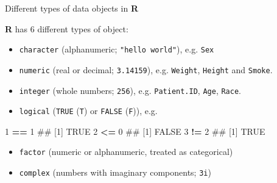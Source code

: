 \documentclass[ignorenonframetext,]{beamer}
\newenvironment{Shaded}{\begin{snugshade}}{\end{snugshade}}
\newcommand{\DecValTok}[1]{\textcolor[rgb]{0.00,0.00,0.81}{#1}}
\newcommand{\StringTok}[1]{\textcolor[rgb]{0.31,0.60,0.02}{#1}}
\newcommand{\OperatorTok}[1]{\textcolor[rgb]{0.81,0.36,0.00}{\textbf{#1}}}
\newcommand{\NormalTok}[1]{#1}
\providecommand{\tightlist}{%
  \setlength{\itemsep}{0pt}\setlength{\parskip}{0pt}}
\let\oldShaded\Shaded
\let\endoldShaded\endShaded
\renewenvironment{Shaded}{\footnotesize\oldShaded}{\endoldShaded}
\begin{document}
\begin{frame}[fragile]{Different types of data objects in \textbf{R}}

\textbf{R} has 6 different types of object:

\begin{itemize}
\tightlist
\item
  \texttt{character} (alphanumeric; \texttt{"hello\ world"}), e.g.
  \texttt{Sex}
\item
  \texttt{numeric} (real or decimal; \texttt{3.14159}), e.g.
  \texttt{Weight}, \texttt{Height} and \texttt{Smoke}.
\item
  \texttt{integer} (whole numbers; \texttt{256}), e.g.
  \texttt{Patient.ID}, \texttt{Age}, \texttt{Race}.
\item
  \texttt{logical} (\texttt{TRUE} (\texttt{T}) or \texttt{FALSE}
  (\texttt{F})), e.g.
\end{itemize}

\begin{Shaded}
\begin{Highlighting}[]
\DecValTok{1} \OperatorTok{==}\StringTok{ }\DecValTok{1}
\NormalTok{## [1] TRUE}
\DecValTok{2} \OperatorTok{<=}\StringTok{ }\DecValTok{0}
\NormalTok{## [1] FALSE}
\DecValTok{3} \OperatorTok{!=}\StringTok{ }\DecValTok{2}
\NormalTok{## [1] TRUE}
\end{Highlighting}
\end{Shaded}

\begin{itemize}
\tightlist
\item
  \texttt{factor} (numeric or alphanumeric, treated as categorical)
\item
  \texttt{complex} (numbers with imaginary components; \texttt{3i})
\end{itemize}

\end{frame}
\end{document}
